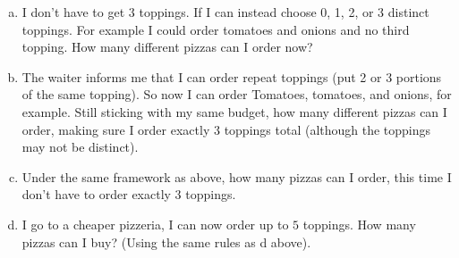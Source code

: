 \documentclass[]{article}
\newif\ifsolutions
\newif\ifmotivation
\renewcommand{\answer}[1]{{\color{mydarkblue}\textbf{Solution:}#1}}
\begin{document}
\begin{qunlist}
\begin{enumerate}[a)]
\ifsolutions{ \answer { 
$\binom{10}{3}$

}}\fi

  \qpart
\item I don't have to get $3$ toppings. If I can instead choose 0, 1, 2, or 3 distinct toppings. For example I could order tomatoes and onions and no third topping. How many different pizzas can I order now?

\ifsolutions{ \answer { 
$\binom{10}{3} + \binom{10}{2} + \binom{10}{1} + \binom{10}{0}$

}}\fi

  \qpart
\item The waiter informs me that I can order repeat toppings (put 2 or 3 portions of the same topping). So now I can order Tomatoes, tomatoes, and onions, for example. Still sticking with my same budget, how many different pizzas can I order, making sure I order exactly $3$ toppings total (although the toppings may not be distinct).

\ifsolutions{ \answer { 
$\binom{10}{3} + 2*\binom{10}{2} + \binom{10}{1}$

}}\fi

\qpart
\item Under the same framework as above, how many pizzas can I order, this time I don't have to order exactly $3$ toppings.

\ifsolutions{ \answer { 
$\binom{10}{3} + 3*\binom{10}{2} + 3*\binom{10}{1} +binom{10}{0}$

}}\fi

\qpart
\item I go to a cheaper pizzeria, I can now order up to $5$ toppings. How many  pizzas can I buy? (Using the same rules as d above).

\ifsolutions{ \answer { 

$$ \binom{10}{5} +  [1+\binom{4}{1}]\binom{10}{4} +  [1+ 2\binom{3}{1} + \binom{3}{2}] \binom{10}{3} + [1+ 3*\binom{2}{1} + 3*\binom{2}{2}  ]\binom{10}{2} + 5*\binom{10}{1} + \binom{10}{0}$$

}}\fi

\end{enumerate}

\ifmotivation
{\motivation {Motivation - Counting continued but d) is tricky.}}
\fi 


%
%



\end{qunlist}
\end{document}
